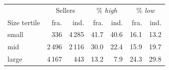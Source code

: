 \begin{tabular}{@{}lrr|rr|rr@{}}
\toprule
 & \multicolumn{2}{c|}{Sellers} & \multicolumn{2}{c|}{\% \emph{high}} & \multicolumn{2}{c}{\% \emph{low}} \\ Size tertile & fra. & ind. & fra. & ind. & fra. & ind. \\
\midrule
small & 336 & 4\,285 & 41.7 & 40.6 & 16.1 & 13.2 \\
mid & 2\,496 & 2\,116 & 30.0 & 22.4 & 15.9 & 19.7 \\
large & 4\,167 & 443 & 13.2 & 7.9 & 24.3 & 29.8 \\
\bottomrule
\end{tabular}
